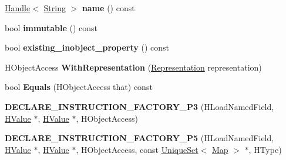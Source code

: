 \begin{DoxyCompactItemize}
\item 
\hypertarget{classv8_1_1internal_1_1_v8___f_i_n_a_l_ae093884f144601c733c3c49b3af199b4}{}\hyperlink{classv8_1_1internal_1_1_handle}{Handle}$<$ \hyperlink{classv8_1_1internal_1_1_string}{String} $>$ {\bfseries name} () const \label{classv8_1_1internal_1_1_v8___f_i_n_a_l_ae093884f144601c733c3c49b3af199b4}

\item 
\hypertarget{classv8_1_1internal_1_1_v8___f_i_n_a_l_ae5605f3e37e5ba7bb0b43af13d9abb5d}{}bool {\bfseries immutable} () const \label{classv8_1_1internal_1_1_v8___f_i_n_a_l_ae5605f3e37e5ba7bb0b43af13d9abb5d}

\item 
\hypertarget{classv8_1_1internal_1_1_v8___f_i_n_a_l_a739b4689dac606ff24d5821922388989}{}bool {\bfseries existing\+\_\+inobject\+\_\+property} () const \label{classv8_1_1internal_1_1_v8___f_i_n_a_l_a739b4689dac606ff24d5821922388989}

\item 
\hypertarget{classv8_1_1internal_1_1_v8___f_i_n_a_l_a463dfdf00141d9b47eb75d8d7a928c07}{}H\+Object\+Access {\bfseries With\+Representation} (\hyperlink{classv8_1_1internal_1_1_representation}{Representation} representation)\label{classv8_1_1internal_1_1_v8___f_i_n_a_l_a463dfdf00141d9b47eb75d8d7a928c07}

\item 
\hypertarget{classv8_1_1internal_1_1_v8___f_i_n_a_l_ab9113d5d88508d0602e2aa3d5442050f}{}bool {\bfseries Equals} (H\+Object\+Access that) const \label{classv8_1_1internal_1_1_v8___f_i_n_a_l_ab9113d5d88508d0602e2aa3d5442050f}

\item 
\hypertarget{classv8_1_1internal_1_1_v8___f_i_n_a_l_af2209847faa3ae535d1d27add06f424f}{}{\bfseries D\+E\+C\+L\+A\+R\+E\+\_\+\+I\+N\+S\+T\+R\+U\+C\+T\+I\+O\+N\+\_\+\+F\+A\+C\+T\+O\+R\+Y\+\_\+\+P3} (H\+Load\+Named\+Field, \hyperlink{classv8_1_1internal_1_1_h_value}{H\+Value} $\ast$, \hyperlink{classv8_1_1internal_1_1_h_value}{H\+Value} $\ast$, H\+Object\+Access)\label{classv8_1_1internal_1_1_v8___f_i_n_a_l_af2209847faa3ae535d1d27add06f424f}

\item 
\hypertarget{classv8_1_1internal_1_1_v8___f_i_n_a_l_a56b2c80148124fb009de7798005378fe}{}{\bfseries D\+E\+C\+L\+A\+R\+E\+\_\+\+I\+N\+S\+T\+R\+U\+C\+T\+I\+O\+N\+\_\+\+F\+A\+C\+T\+O\+R\+Y\+\_\+\+P5} (H\+Load\+Named\+Field, \hyperlink{classv8_1_1internal_1_1_h_value}{H\+Value} $\ast$, \hyperlink{classv8_1_1internal_1_1_h_value}{H\+Value} $\ast$, H\+Object\+Access, const \hyperlink{classv8_1_1internal_1_1_unique_set}{Unique\+Set}$<$ \hyperlink{classv8_1_1internal_1_1_map}{Map} $>$ $\ast$, H\+Type)\label{classv8_1_1internal_1_1_v8___f_i_n_a_l_a56b2c80148124fb009de7798005378fe}


\end{DoxyCompactItemize}
